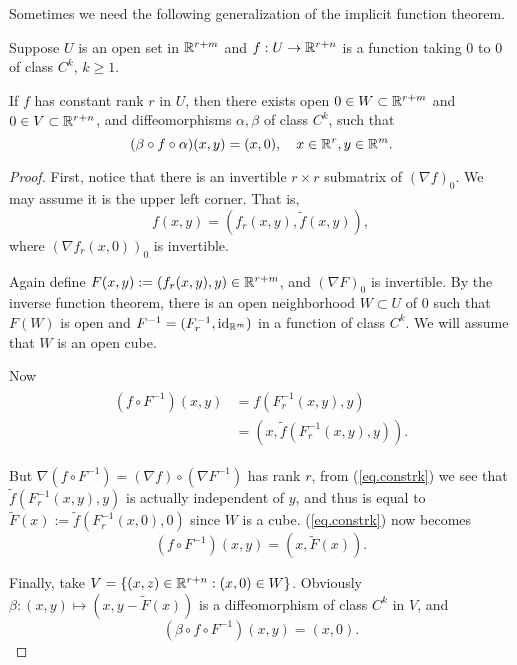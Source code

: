 Sometimes we need the following generalization of the implicit function theorem.

\begin{theorem}
    Suppose $U$ is an open set in $\mathbb{R}^{r+m}$ and $f:U\to\mathbb{R}^{r+n}$ is a function taking $0$ to $0$ of class $C^k$, $k\geq 1$.

    If $f$ has constant rank $r$ in $U$, then there exists open $0\in W\subset\mathbb{R}^{r+m}$ and $0\in V\subset\mathbb{R}^{r+n}$, and diffeomorphisms $\alpha, \beta$ of class $C^k$, such that
    $$(\beta\circ f\circ\alpha)(x,y)=(x,0),\quad x\in\mathbb{R}^r, y\in\mathbb{R}^m.$$
\end{theorem}

\begin{proof}
    First, notice that there is an invertible $r\times r$ submatrix of $(\nabla f)_0$. We may assume it is the upper left corner. That is, 
    $$f(x,y)=(f_r(x,y),\tilde f(x,y)),$$
    where $(\nabla f_r(x,0))_0$ is invertible.

    Again define $F(x,y):=(f_r(x,y),y)\in\mathbb{R}^{r+m}$, and $(\nabla F)_0$ is invertible. By the inverse function theorem, there is an open neighborhood $W\subset U$ of $0$ such that $F(W)$ is open and $F^{-1}=(F_r^{-1},\operatorname{id}_{\mathbb{R}^m})$ in a function of class $C^k$. We will assume that $W$ is an open cube.

    Now 
    \begin{align}\begin{split}\label{eq.constrk}
        (f\circ F^{-1})(x,y) &=f(F_r^{-1}(x,y),y) \\
        &=(x,\tilde f(F_r^{-1}(x,y),y)).
    \end{split}\end{align}

    But $\nabla(f\circ F^{-1})=(\nabla f)\circ(\nabla F^{-1})$ has rank $r$, from (\ref{eq.constrk}) we see that $\tilde f(F_r^{-1}(x,y),y)$ is actually independent of $y$, and thus is equal to $\tilde F(x):=\tilde f(F_r^{-1}(x,0),0)$ since $W$ is a cube. (\ref{eq.constrk}) now becomes
    $$(f\circ F^{-1})(x,y)=(x,\tilde F(x)).$$

    Finally, take $V=\{(x,z)\in\mathbb{R}^{r+n}:(x,0)\in W\}$. Obviously $\beta:(x,y)\mapsto (x,y-\tilde F(x))$ is a diffeomorphism of class $C^k$ in $V$, and
    $$(\beta\circ f\circ F^{-1})(x,y)=(x,0).$$
\end{proof}